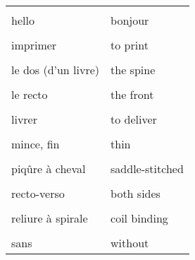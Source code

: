 \documentclass[
  10pt,
]{article}
\begin{document}
\begin{longtable}{ll}
\cellcolor{gray!6}{gravé au laser} & \cellcolor{gray!6}{laser-etched}\\

hello & bonjour\\

\cellcolor{gray!6}{humecter, humidifier} & \cellcolor{gray!6}{to dampen}\\

imprimer & to print\\

\cellcolor{gray!6}{item fonctionner} & \cellcolor{gray!6}{to work}\\

le dos (d'un livre) & the spine\\

\cellcolor{gray!6}{le grammage} & \cellcolor{gray!6}{paper weight}\\

le recto & the front\\

\cellcolor{gray!6}{le verso} & \cellcolor{gray!6}{the back}\\

livrer & to deliver\\

\cellcolor{gray!6}{mieux convenir à} & \cellcolor{gray!6}{to be best suited for}\\

mince, fin & thin\\

\cellcolor{gray!6}{pailleté, miroitant} & \cellcolor{gray!6}{shimmery}\\

piqûre à cheval & saddle-stitched\\

\cellcolor{gray!6}{précis, aiguisé} & \cellcolor{gray!6}{sharp}\\

recto-verso & both sides\\

\cellcolor{gray!6}{relier (un livre)} & \cellcolor{gray!6}{to bind (bound, bound)}\\

reliure à spirale & coil binding\\

\cellcolor{gray!6}{résulter dans, aboutir à} & \cellcolor{gray!6}{to result in}\\

sans & without\\


\end{longtable}
\end{document}
